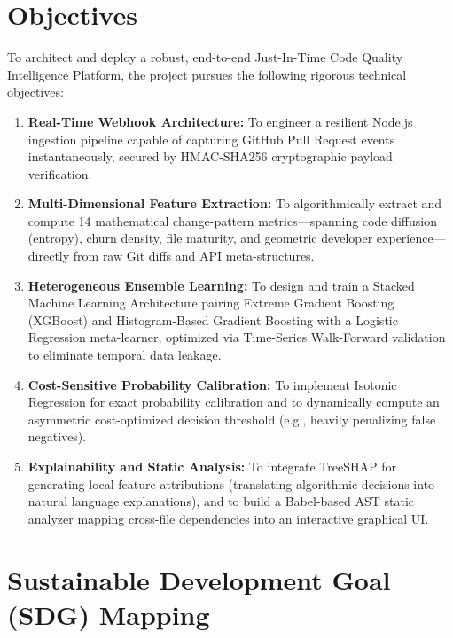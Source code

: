 \documentclass[12pt, a4paper]{article}
\begin{document}
\clearpage
\section{Objectives}

To architect and deploy a robust, end-to-end Just-In-Time Code Quality Intelligence Platform, the project pursues the following rigorous technical objectives:

\begin{enumerate}
    \item \textbf{Real-Time Webhook Architecture:} To engineer a resilient Node.js ingestion pipeline capable of capturing GitHub Pull Request events instantaneously, secured by HMAC-SHA256 cryptographic payload verification.
    
    \item \textbf{Multi-Dimensional Feature Extraction:} To algorithmically extract and compute 14 mathematical change-pattern metrics---spanning code diffusion (entropy), churn density, file maturity, and geometric developer experience---directly from raw Git diffs and API meta-structures.
    
    \item \textbf{Heterogeneous Ensemble Learning:} To design and train a Stacked Machine Learning Architecture pairing Extreme Gradient Boosting (XGBoost) and Histogram-Based Gradient Boosting with a Logistic Regression meta-learner, optimized via Time-Series Walk-Forward validation to eliminate temporal data leakage.
    
    \item \textbf{Cost-Sensitive Probability Calibration:} To implement Isotonic Regression for exact probability calibration and to dynamically compute an asymmetric cost-optimized decision threshold (e.g., heavily penalizing false negatives).
    
    \item \textbf{Explainability and Static Analysis:} To integrate TreeSHAP for generating local feature attributions (translating algorithmic decisions into natural language explanations), and to build a Babel-based AST static analyzer mapping cross-file dependencies into an interactive graphical UI.
\end{enumerate}

\clearpage
\section{Sustainable Development Goal (SDG) Mapping}
\end{document}
